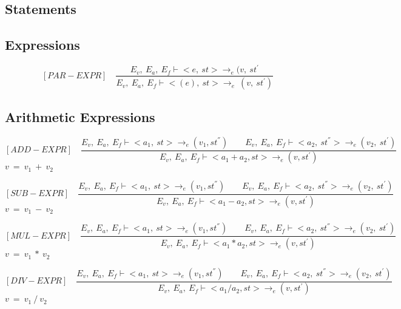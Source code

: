    	\subsection{Statements}
   	
   	\subsection{Expressions}
   	
   	\[
   	[PAR-EXPR] \quad
   	\dfrac{E_v, \ E_a, \ E_f \vdash <e, \ st> \rightarrow_e (v, \ st^{'}}{E_v, \ E_a, \ E_f \vdash <(e), \ st> \rightarrow_e \ (v, \ st^{'})}
   	\]
   	
   	\subsection{Arithmetic Expressions}
   	
   	\[
   	[ADD-EXPR] \quad
   	\dfrac{E_v, \ E_a, \ E_f \vdash <a_1, \ st> \rightarrow_{e} (v_1, st^{''}) \qquad E_v, \ E_a, \ E_f \vdash <a_2, \ st^{''}> \rightarrow_e (v_2, \ st^{'})}{E_v, \ E_a, \ E_f \vdash <a_1 + a_2, st> \rightarrow_{e} (v, st^{'})}
   	\]
 	\begin{math}
   	v \ = \ v_1 \ + \ v_2
   	\end{math}
   	
   	\[
   	[SUB-EXPR] \quad
   	\dfrac{E_v, \ E_a, \ E_f \vdash <a_1, \ st> \rightarrow_{e} (v_1, st^{''}) \qquad E_v, \ E_a, \ E_f \vdash <a_2, \ st^{''}> \rightarrow_e (v_2, \ st^{'})}{E_v, \ E_a, \ E_f \vdash <a_1 - a_2, st> \rightarrow_{e} (v, st^{'})}
   	\]
   	\begin{math}
   	v \ = \ v_1 \ - \ v_2
   	\end{math}
   	
   	\[
   	[MUL-EXPR] \quad
   	\dfrac{E_v, \ E_a, \ E_f \vdash <a_1, \ st> \rightarrow_{e} (v_1, st^{''}) \qquad E_v, \ E_a, \ E_f \vdash <a_2, \ st^{''}> \rightarrow_e (v_2, \ st^{'})}{E_v, \ E_a, \ E_f \vdash <a_1 * a_2, st> \rightarrow_{e} (v, st^{'})}
   	\]
   	\begin{math}
   	v \ = \ v_1 \ * \ v_2
   	\end{math}
   	
   	\[
   	[DIV-EXPR] \quad
   	\dfrac{E_v, \ E_a, \ E_f \vdash <a_1, \ st> \rightarrow_{e} (v_1, st^{''}) \qquad E_v, \ E_a, \ E_f \vdash <a_2, \ st^{''}> \rightarrow_e (v_2, \ st^{'})}{E_v, \ E_a, \ E_f \vdash <a_1 / a_2, st> \rightarrow_{e} (v, st^{'})}
   	\]
   	\begin{math}
   	v \ = \ v_1 \ / \ v_2
   	\end{math}   	   	

